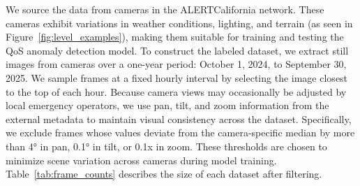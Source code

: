 \documentclass[remotesensing,article,submit,moreauthors]{Definitions/mdpi}
\begin{document}
We source the data from cameras in the ALERTCalifornia network. These cameras exhibit variations in weather conditions, lighting, and terrain (as seen in Figure~\ref{fig:level_examples}), making them suitable for training and testing the \Ac{QoS} anomaly detection model. To construct the labeled dataset, we extract still images from cameras over a one-year period: October 1, 2024, to September 30, 2025. We sample frames at a fixed hourly interval by selecting the image closest to the top of each hour. Because camera views may occasionally be adjusted by local emergency operators, we use pan, tilt, and zoom information from the external metadata to maintain visual consistency across the dataset. Specifically, we exclude frames whose values deviate from the camera-specific median by more than 4° in pan, 0.1° in tilt, or 0.1x in zoom. These thresholds are chosen to minimize scene variation across cameras during model training. Table~\ref{tab:frame_counts} describes the size of each dataset after filtering. 
\end{document}

